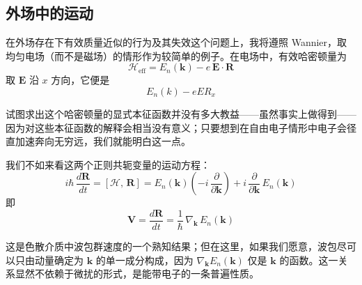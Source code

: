 


\subsection{外场中的运动}

在外场存在下有效质量近似的行为及其失效这个问题上，我将遵照 Wannier，取均匀电场（而不是磁场）的情形作为较简单的例子。在电场中，有效哈密顿量为
\begin{equation*}
\mathcal{H}_{\text{eff}} = E_n(\mathbf{k}) - e\,\mathbf{E}\cdot\mathbf{R}
\end{equation*}
取 $\mathbf{E}$ 沿 $x$ 方向，它便是
\begin{equation*}
E_n(k) - eER_x
\end{equation*}

试图求出这个哈密顿量的显式本征函数并没有多大教益——虽然事实上做得到——因为对这些本征函数的解释会相当没有意义；只要想到在自由电子情形中电子会径直加速奔向无穷远，我们就能明白这一点。

我们不如来看这两个正则共轭变量的运动方程：
\begin{equation*}
i\hbar\,\frac{d\mathbf{R}}{dt} = [\mathcal{H},\,\mathbf{R}] = E_n(\mathbf{k})\left(-i\,\frac{\partial}{\partial\mathbf{k}}\right) + i\,\frac{\partial}{\partial\mathbf{k}}\,E_n(\mathbf{k})
\end{equation*}
即
\begin{equation*}
\mathbf{V} = \frac{d\mathbf{R}}{dt} = \frac{1}{\hbar}\,\nabla_{\mathbf{k}}\,E_n(\mathbf{k})
\end{equation*}

这是色散介质中波包群速度的一个熟知结果；但在这里，如果我们愿意，波包尽可以只由动量确定为 $\mathbf{k}$ 的单一成分构成，因为 $\nabla_{\mathbf{k}}E_n(\mathbf{k})$ 仅是 $\mathbf{k}$ 的函数。这一关系显然不依赖于微扰的形式，是能带电子的一条普遍性质。

